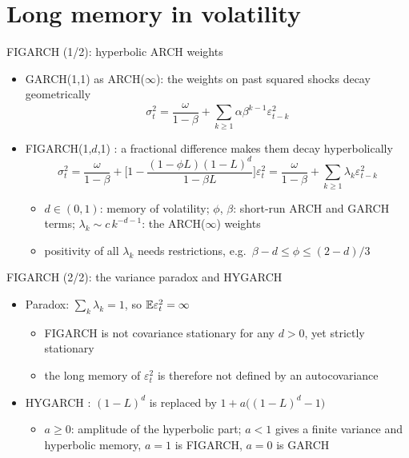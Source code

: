 \section{Long memory in volatility}

\begin{frame}{FIGARCH (1/2): hyperbolic ARCH weights}
\itemsize{\small}
\begin{itemize}
    \item GARCH(1,1) as ARCH($\infty$): the weights on past squared shocks decay geometrically
    \[ \sigma_t^2 = \frac{\omega}{1 - \beta} + \sum_{k\ge1}\alpha\beta^{k-1}\varepsilon_{t-k}^2 \]
    \item FIGARCH(1,$d$,1) : a fractional difference makes them decay hyperbolically
    \[ \sigma_t^2 = \frac{\omega}{1 - \beta} + \Big[1 - \frac{(1 - \phi L)(1 - L)^d}{1 - \beta L}\Big]\varepsilon_t^2 = \frac{\omega}{1 - \beta} + \sum_{k\ge1}\lambda_k\varepsilon_{t-k}^2 \]
    \begin{itemize}
        \item $d \in (0, 1)$: memory of volatility; $\phi$, $\beta$: short-run ARCH and GARCH terms; $\lambda_k \sim c\,k^{-d-1}$: the ARCH($\infty$) weights
        \item positivity of all $\lambda_k$ needs restrictions, e.g.\ $\beta - d \le \phi \le (2 - d)/3$
    \end{itemize}
\end{itemize}
\end{frame}

\begin{frame}{FIGARCH (2/2): the variance paradox and HYGARCH}
\itemsize{\small}
\begin{itemize}
    \item Paradox: $\sum_k\lambda_k = 1$, so $\mathbb{E}\varepsilon_t^2 = \infty$
    \begin{itemize}
        \item FIGARCH is not covariance stationary for any $d > 0$, yet strictly stationary
        \item the long memory of $\varepsilon_t^2$ is therefore not defined by an autocovariance
    \end{itemize}
    \item HYGARCH : $(1 - L)^d$ is replaced by $1 + a\big((1 - L)^d - 1\big)$
    \begin{itemize}
        \item $a \ge 0$: amplitude of the hyperbolic part; $a < 1$ gives a finite variance and hyperbolic memory, $a = 1$ is FIGARCH, $a = 0$ is GARCH
    \end{itemize}
\end{itemize}
\end{frame}

